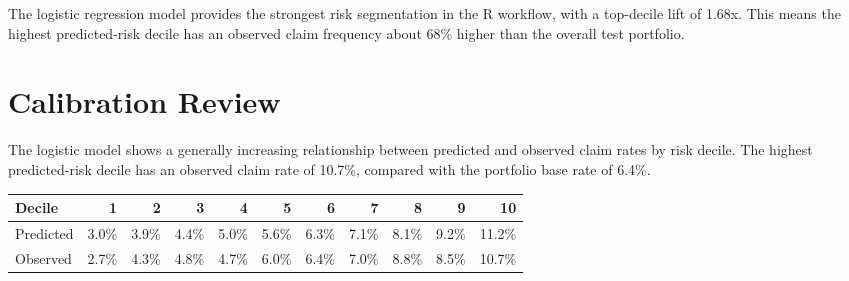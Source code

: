 \documentclass[11pt,letterpaper]{article}
\begin{document}
The logistic regression model provides the strongest risk segmentation in the R workflow, with a top-decile lift of 1.68x. This means the highest predicted-risk decile has an observed claim frequency about 68\% higher than the overall test portfolio.

\section{Calibration Review}

The logistic model shows a generally increasing relationship between predicted and observed claim rates by risk decile. The highest predicted-risk decile has an observed claim rate of 10.7\%, compared with the portfolio base rate of 6.4\%.

\begin{center}
\small
\begin{tabular}{lrrrrrrrrrr}
\toprule
Decile & 1 & 2 & 3 & 4 & 5 & 6 & 7 & 8 & 9 & 10 \\
\midrule
Predicted & 3.0\% & 3.9\% & 4.4\% & 5.0\% & 5.6\% & 6.3\% & 7.1\% & 8.1\% & 9.2\% & 11.2\% \\
Observed & 2.7\% & 4.3\% & 4.8\% & 4.7\% & 6.0\% & 6.4\% & 7.0\% & 8.8\% & 8.5\% & 10.7\% \\
\bottomrule
\end{tabular}
\end{center}
\end{document}
